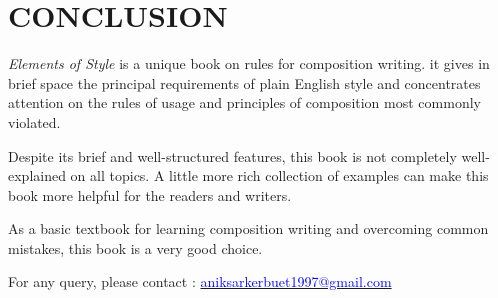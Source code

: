 \documentclass{report}
\begin{document}
    \chapter{CONCLUSION}{
        \textit{Elements of Style} is a unique book on rules for composition writing. it gives in brief space the principal requirements of plain English style and concentrates attention on the rules of usage and principles of composition most commonly violated.
        
        \bigskip
        
        Despite its brief and well-structured features, this book is not completely well-explained on all topics. A little more rich collection of examples can make this book more helpful for the readers and writers.
        
        \bigskip
        
        As a basic textbook for learning composition writing and overcoming common mistakes, this book is a very good choice.
        
        \bigskip
        
        For any query, please contact : 
        \href{http://aniksarkerbuet1997@gmail.com}{\textcolor{blue}{aniksarkerbuet1997@gmail.com}}
    }
    
    
\end{document}
